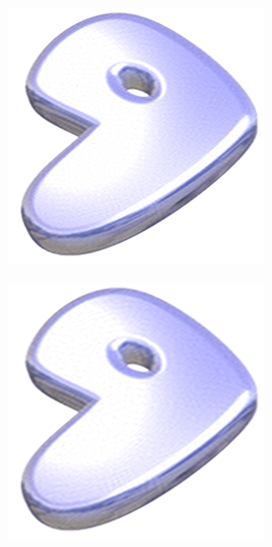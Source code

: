 \documentclass[11pt]{report}
\theoremstyle{plain}
\theoremstyle{remark}
\begin{document}
\pagebreak
{}
\begin{figure}
	\centering
	\begin{subfigure}[b]{0.24\textwidth}
		\centering
		\includegraphics[width=\textwidth]{plaatjes/gentoo_fourier_0_15.png}
	\end{subfigure}
	\begin{subfigure}[b]{0.24\textwidth}
		\centering
		\includegraphics[width=\textwidth]{plaatjes/gentoo_fourier_0_1.png}

\end{subfigure}
\end{figure}
\end{document}
